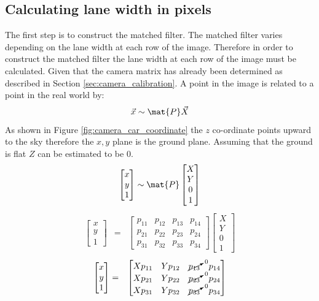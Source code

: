 \subsection{Calculating lane width in pixels}
The first step is to construct the matched filter. The matched filter varies 
depending on the lane width at each row of the image. Therefore in order to 
construct the matched filter the lane width at each row of the image must be 
calculated. Given that the camera matrix has already been determined as 
described in Section \ref{sec:camera_calibration}. A point in the image is 
related to a point in the real world by:
\begin{equation}\vec{x} \sim \mat{P}\vec{X} \end{equation} \label{eq:camera_eq}
As shown in Figure \ref{fig:camera_car_coordinate} the $z$ co-ordinate points 
upward to the sky therefore the $x,y$ plane is the ground plane. Assuming that 
the ground is flat $Z$ can be estimated to be $0$. 
\[
\begin{bmatrix}x\\y\\1\end{bmatrix}  \sim 
\mat{P} \begin{bmatrix}X\\Y\\0\\1\end{bmatrix}
\]
\begin{eqnarray*}
\begin{bmatrix}x\\y\\1\end{bmatrix} & = & 
\begin{bmatrix}
p_{11} & p_{12} & p_{13} & p_{14} \\
p_{21} & p_{22} & p_{23} & p_{24} \\
p_{31} & p_{32} & p_{33} & p_{34}
\end{bmatrix}
\begin{bmatrix}X\\Y\\0\\1\end{bmatrix}
\end{eqnarray*}
\begin{eqnarray*}
\begin{bmatrix}x\\y\\1\end{bmatrix} & = & 
\begin{bmatrix}
        Xp_{11} & Yp_{12} & \cancelto{0}{p_{13}} & p_{14} \\
        Xp_{21} & Yp_{22} & \cancelto{0}{p_{23}} & p_{24} \\
        Xp_{31} & Yp_{32} & \cancelto{0}{p_{33}} & p_{34}
\end{bmatrix} \\
\end{eqnarray*}
